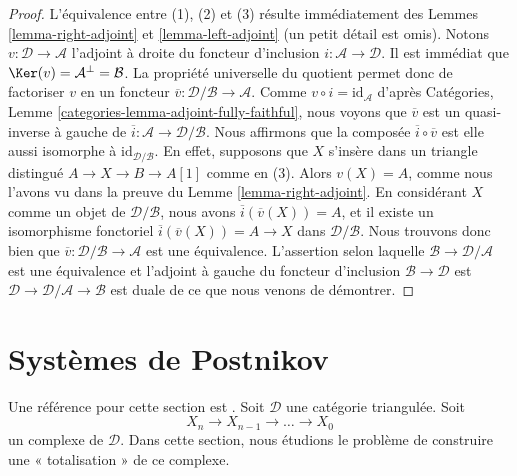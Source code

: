 \begin{proof}
L'équivalence entre (1), (2) et (3) résulte immédiatement des Lemmes
\ref{lemma-right-adjoint} et \ref{lemma-left-adjoint} (un petit détail est
omis). Notons $v : \mathcal{D} \to \mathcal{A}$ l'adjoint à droite du foncteur
d'inclusion $i : \mathcal{A} \to \mathcal{D}$.
Il est immédiat que $\Ker(v) = \mathcal{A}^\perp = \mathcal{B}$.
La propriété universelle du quotient permet donc de factoriser $v$ en un
foncteur $\overline{v} : \mathcal{D}/\mathcal{B} \to \mathcal{A}$.
Comme $v \circ i = \text{id}_\mathcal{A}$ d'après
Catégories, Lemme \ref{categories-lemma-adjoint-fully-faithful}, nous voyons
que $\overline{v}$ est un quasi-inverse à gauche de
$\overline{i} : \mathcal{A} \to \mathcal{D}/\mathcal{B}$.
Nous affirmons que la composée $\overline{i} \circ \overline{v}$ est elle
aussi isomorphe à $\text{id}_{\mathcal{D}/\mathcal{B}}$.
En effet, supposons que $X$ s'insère dans un triangle distingué
$A \to X \to B \to A[1]$ comme en (3). Alors $v(X) = A$, comme nous l'avons vu
dans la preuve du Lemme \ref{lemma-right-adjoint}.
En considérant $X$ comme un objet de $\mathcal{D}/\mathcal{B}$, nous avons
$\overline{i}(\overline{v}(X)) = A$, et il existe un isomorphisme fonctoriel
$\overline{i}(\overline{v}(X)) = A \to X$ dans
$\mathcal{D}/\mathcal{B}$. Nous trouvons donc bien que
$\overline{v} : \mathcal{D}/\mathcal{B} \to \mathcal{A}$ est une équivalence.
L'assertion selon laquelle $\mathcal{B} \to \mathcal{D}/\mathcal{A}$ est une
équivalence et l'adjoint à gauche du foncteur d'inclusion
$\mathcal{B} \to \mathcal{D}$ est
$\mathcal{D} \to \mathcal{D}/\mathcal{A} \to \mathcal{B}$ est duale de ce
que nous venons de démontrer.
\end{proof}

\section{Systèmes de Postnikov}
\label{section-postnikov}

\noindent
Une référence pour cette section est \cite{Orlov-K3}. Soit $\mathcal{D}$
une catégorie triangulée. Soit
$$
X_n \to X_{n - 1} \to \ldots \to X_0
$$
un complexe de $\mathcal{D}$. Dans cette section, nous étudions le problème
de construire une « totalisation » de ce complexe.


